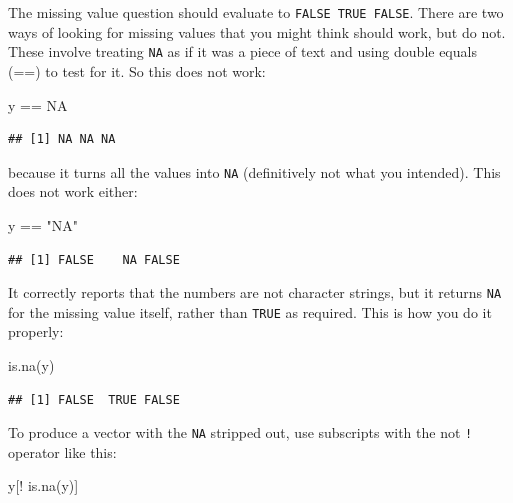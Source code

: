 \documentclass[
]{book}
\newenvironment{Shaded}{\begin{snugshade}}{\end{snugshade}}
\newcommand{\ConstantTok}[1]{\textcolor[rgb]{0.00,0.00,0.00}{#1}}
\newcommand{\FunctionTok}[1]{\textcolor[rgb]{0.00,0.00,0.00}{#1}}
\newcommand{\NormalTok}[1]{#1}
\newcommand{\SpecialCharTok}[1]{\textcolor[rgb]{0.00,0.00,0.00}{#1}}
\newcommand{\StringTok}[1]{\textcolor[rgb]{0.31,0.60,0.02}{#1}}
\begin{document}
The missing value question should evaluate to \texttt{FALSE\ TRUE\ FALSE}. There are two ways of looking for missing values that you might think should work, but do not. These involve treating \texttt{NA} as if it was a piece of text and using double equals (==) to test for it. So this does not work:

\begin{Shaded}
\begin{Highlighting}[]
\NormalTok{y }\SpecialCharTok{==} \ConstantTok{NA}
\end{Highlighting}
\end{Shaded}

\begin{verbatim}
## [1] NA NA NA
\end{verbatim}

because it turns all the values into \texttt{NA} (definitively not what you intended). This does not work either:

\begin{Shaded}
\begin{Highlighting}[]
\NormalTok{y }\SpecialCharTok{==} \StringTok{"NA"}
\end{Highlighting}
\end{Shaded}

\begin{verbatim}
## [1] FALSE    NA FALSE
\end{verbatim}

It correctly reports that the numbers are not character strings, but it returns \texttt{NA} for the missing value itself, rather than \texttt{TRUE} as required. This is how you do it properly:

\begin{Shaded}
\begin{Highlighting}[]
\FunctionTok{is.na}\NormalTok{(y)}
\end{Highlighting}
\end{Shaded}

\begin{verbatim}
## [1] FALSE  TRUE FALSE
\end{verbatim}

To produce a vector with the \texttt{NA} stripped out, use subscripts with the not \texttt{!} operator like this:

\begin{Shaded}
\begin{Highlighting}[]
\NormalTok{y[}\SpecialCharTok{!} \FunctionTok{is.na}\NormalTok{(y)]}
\end{Highlighting}
\end{Shaded}
\end{document}
